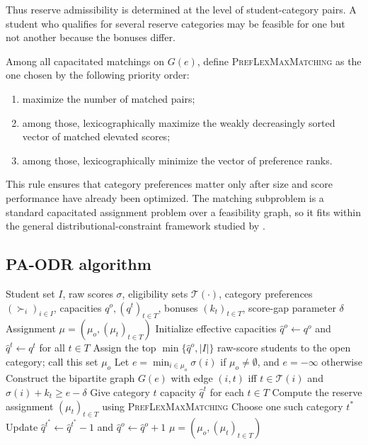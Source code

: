 \documentclass[runningheads]{llncs}
\newcommand{\T}{\mathcal{T}}
\newcommand{\1}{\mathbf{1}}
\begin{document}
Thus reserve admissibility is determined at the level of student-category pairs. A student who qualifies for several reserve categories may be feasible for one but not another because the bonuses differ.

Among all capacitated matchings on $G(e)$, define \textsc{PrefLexMaxMatching} as the one chosen by the following priority order:
\begin{enumerate}
\item maximize the number of matched pairs;
\item among those, lexicographically maximize the weakly decreasingly sorted vector of matched elevated scores;
\item among those, lexicographically minimize the vector of preference ranks.
\end{enumerate}

This rule ensures that category preferences matter only after size and score performance have already been optimized. The matching subproblem is a standard capacitated assignment problem over a feasibility graph, so it fits within the general distributional-constraint framework studied by \cite{GKK+17a}.

\subsection{PA-ODR algorithm}

\begin{algorithm}[H]
\caption{Preference-Aware Overlapping De-Reservation (PA-ODR)}
\begin{algorithmic}[1]
\Require Student set $I$, raw scores $\sigma$, eligibility sets $\T(\cdot)$, category preferences $(\succ_i)_{i\in I}$, capacities $q^o,(q^t)_{t\in T}$, bonuses $(k_t)_{t\in T}$, score-gap parameter $\delta$
\Ensure Assignment $\mu=(\mu_o,(\mu_t)_{t\in T})$
\State Initialize effective capacities $\hat q^o\gets q^o$ and $\hat q^t\gets q^t$ for all $t\in T$
\Loop
    \State Assign the top $\min\{\hat q^o,|I|\}$ raw-score students to the open category; call this set $\mu_o$
    \State Let $e=\min_{i\in\mu_o}\sigma(i)$ if $\mu_o\neq\emptyset$, and $e=-\infty$ otherwise
    \State Construct the bipartite graph $G(e)$ with edge $(i,t)$ iff $t\in\T(i)$ and $\sigma(i)+k_t\ge e-\delta$
    \State Give category $t$ capacity $\hat q^t$ for each $t\in T$
    \State Compute the reserve assignment $(\mu_t)_{t\in T}$ using \textsc{PrefLexMaxMatching}
        \State Choose one such category $t^\ast$
        \State Update $\hat q^{t^\ast}\gets\hat q^{t^\ast}-1$ and $\hat q^o\gets\hat q^o+1$
    \Else
        \State \Return $\mu=(\mu_o,(\mu_t)_{t\in T})$
    \EndIf
\EndLoop
\end{algorithmic}
\end{algorithm}
\end{document}
